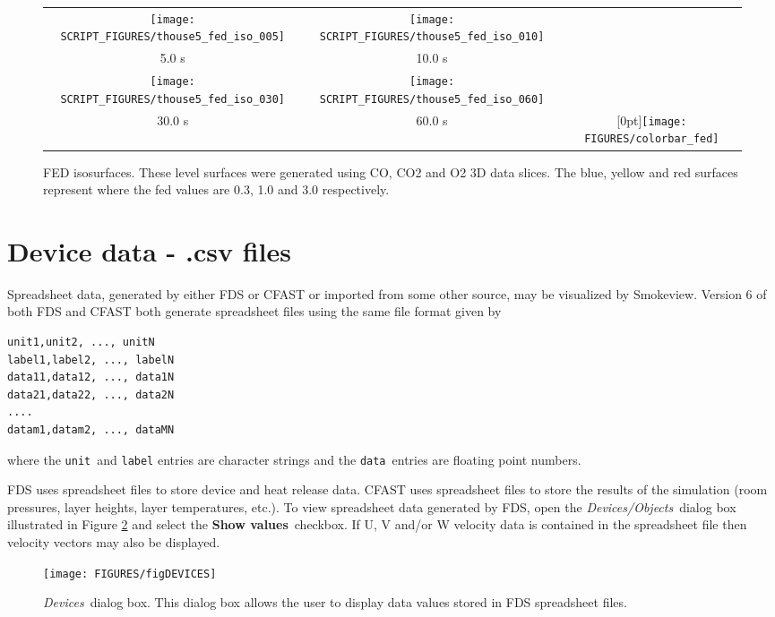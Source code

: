 \documentclass[11pt,twoside]{book}
\begin{document}
\begin{figure}[\figoptions]
\begin{center}
\begin{tabular}{ccc}
\texttt{[image: SCRIPT\_FIGURES/thouse5\_fed\_iso\_005]}&
\texttt{[image: SCRIPT\_FIGURES/thouse5\_fed\_iso\_010]}\\
5.0 s&10.0 s\\
\texttt{[image: SCRIPT\_FIGURES/thouse5\_fed\_iso\_030]}&
\texttt{[image: SCRIPT\_FIGURES/thouse5\_fed\_iso\_060]}&\\
30.0 s&60.0 s
&\raisebox{0.0ex}[0pt]{\texttt{[image: FIGURES/colorbar\_fed]}}\\
\end{tabular}
\caption [FED slices.]
{FED isosurfaces.
These level surfaces were generated using CO, CO2 and O2 3D data slices.
The blue, yellow and red surfaces represent where the fed values are 0.3, 1.0 and 3.0 respectively.
}
\label{figfediso}%
\end{center}
\end{figure}

\section{Device data - .csv files}
Spreadsheet data, generated by either FDS or CFAST or imported from some other source, may be visualized by Smokeview.
Version 6 of both FDS and CFAST
both generate spreadsheet files using the same file format given by
\begin{lstlisting}
unit1,unit2, ..., unitN
label1,label2, ..., labelN
data11,data12, ..., data1N
data21,data22, ..., data2N
....
datam1,datam2, ..., dataMN
\end{lstlisting}
where the {\tt unit}\ and {\tt label} entries are character strings and the {\tt data}\ entries are floating point numbers.

FDS uses spreadsheet files to store device and heat release data.
CFAST uses spreadsheet files to store the results of the
simulation (room pressures, layer heights, layer temperatures,
etc.). To view spreadsheet data generated by FDS, open the {\em
Devices/Objects}\ dialog box illustrated in Figure
\ref{figDEVICES} and select the {\bf Show values}\ checkbox. If U,
V and/or W velocity data is contained in the spreadsheet file then
velocity vectors may also be displayed.

\begin{figure}[\figoptions]
\begin{center}
\texttt{[image: FIGURES/figDEVICES]}
\end{center}
\caption[{\em Devices}\ dialog box.]{{\em Devices}\ dialog box.
This dialog box allows the user to display data values stored in
FDS spreadsheet files.} \label{figDEVICES}
\end{figure}
\end{document}

